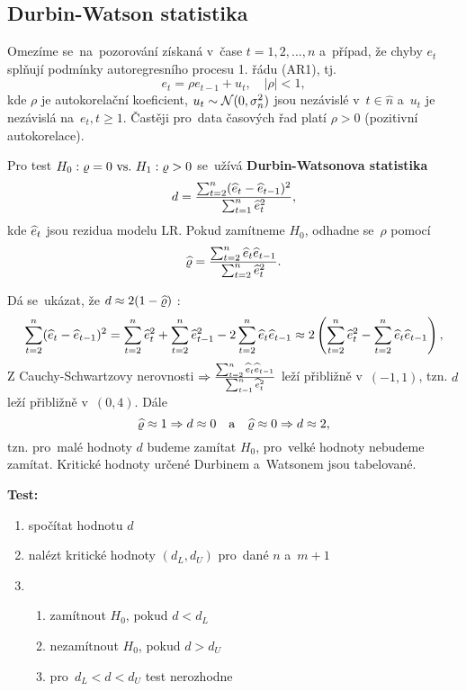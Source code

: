 \subsection{Durbin-Watson statistika}
Omezíme se~na~pozorování získaná v~čase $t = 1,2,..., n$ a~případ, že chyby $e_t$ splňují podmínky autoregresního procesu 1. řádu (AR1), tj.
 $$
e_t = \rho e_{t-1}+ u_t, \quad |\rho| < 1,
 $$
kde $\rho$ je autokorelační koeficient, $u_t \sim \mathcal{N} (0, \sigma_n^2)$ jsou nezávislé v~$t  \in\widehat{n} $ a~$u_t$ je nezávislá na~$e_t, t \geq 1$. Častěji pro~data časových řad platí $\rho > 0$ (pozitivní autokorelace).

Pro test $H_0: \varrho = 0 ~\text{vs.}~ H_1: \varrho > 0$ se~užívá \textbf{Durbin-Watsonova statistika}
 $$
d = \frac{\sum_{t = 2}^n(\widehat{e}_t - \widehat{e}_{t-1})^2}{\sum_{t = 1}^n \widehat{e}_t^2},
 $$
kde $\widehat{e}_t$ jsou rezidua modelu LR. Pokud zamítneme $H_0$, odhadne se~$\rho$ pomocí
 $$
\widehat{\varrho} = \frac{\sum_{t = 2}^n \widehat{e}_t \widehat{e}_{t-1}}{\sum_{t = 2}^n \widehat{e}_t^2}.
 $$

\newcommand{\sumtn}{\sum_{t = 2}^n}
\begin{remark}
Dá se~ukázat, že $d \approx 2(1-\widehat{\varrho})$ :
 $$
\sum_{t = 2}^n(\he_t - \he_{t-1})^2 = \sumtn \he_t^2 + \sumtn \he_{t-1}^2 - 2 \sumtn \he_t \he_{t-1} \approx 2 \left(\sumtn \he_t^2 - \sumtn \he_t \he_{t-1} \right),
 $$
Z Cauchy-Schwartzovy nerovnosti $\Rightarrow \frac{\sumtn \he_t \he_{t-1}}{\sum_{t = 1}^n \he_t^2}$ leží přibližně v~$(-1,1)$, tzn. $d$ leží přibližně v~$(0,4)$. Dále
 $$
\widehat{\varrho} \approx 1 \Rightarrow d \approx 0 \quad \text{a} \quad \widehat{\varrho} \approx 0 \Rightarrow d \approx 2,
 $$
tzn. pro~malé hodnoty $d$ budeme zamítat $H_0$, pro~velké hodnoty nebudeme zamítat. Kritické hodnoty určené Durbinem a~Watsonem jsou tabelované.
\end{remark}

\noindent \textbf{Test:}
\begin{enumerate}
	\item spočítat hodnotu $d$
	\item nalézt kritické hodnoty $(d_L,d_U)$ pro~dané $n$ a~$m+1$
	\item \begin{enumerate}
		\item zamítnout $H_0$, pokud $d < d_L$
		\item nezamítnout $H_0$, pokud $d > d_U$
		\item pro~$d_L < d < d_U$ test nerozhodne
	\end{enumerate}
\end{enumerate}

